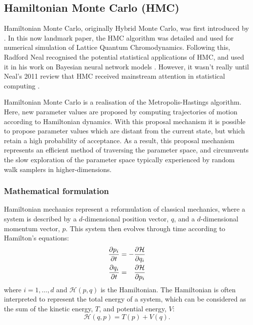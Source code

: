 \subsection{Hamiltonian Monte Carlo (HMC)}

Hamiltonian Monte Carlo, originally Hybrid Monte Carlo, was first introduced by
\textcite{duane87}. In this now landmark paper, the HMC algorithm was detailed and used
for numerical simulation of Lattice Quantum Chromodynamics. Following this, Radford Neal
recognised the potential statistical applications of HMC, and used it in his work on
Bayesian neural network models \parencite{neal95}. However, it wasn't really until Neal's
2011 review \parencite{neal11} that HMC received mainstream attention in statistical
computing \parencite{betancourt18}.

Hamiltonian Monte Carlo is a realisation of the Metropolis-Hastings algorithm. Here,
new parameter values are proposed by computing trajectories of motion according to
Hamiltonian dynamics. With this proposal mechanism it is possible to propose parameter
values which are distant from the current state, but which retain a high probability of
acceptance. As a result, this proposal mechanism represents an efficient method of
traversing the parameter space, and circumvents the slow exploration of the parameter
space typically experienced by random walk samplers in higher-dimensions.

\subsubsection{Mathematical formulation}

Hamiltonian mechanics represent a reformulation of classical mechanics, where a system is
described by a $d$-dimensional position vector, $q$, and a $d$-dimensional momentum
vector, $p$. This system then evolves through time according to Hamilton's
equations:
\begin{align}
  \begin{split}
    \pdv{p_i}{t} &= - \pdv{\mathcal{H}}{q_i}\\
    \pdv{q_i}{t} &= \hphantom{-} \pdv{\mathcal{H}}{p_i}
  \end{split}
\end{align}
where $i=1,\ldots,d$ and $\mathcal{H}(p, q)$ is the Hamiltonian. The
Hamiltonian is often interpreted to represent the total energy of a system, which can be
considered as the sum of the kinetic energy, $T$, and potential energy, $V$:
\begin{equation}
  \label{eq:hamiltonian_decomp}
  \mathcal{H}(q, p) = T(p) + V(q).
\end{equation}


